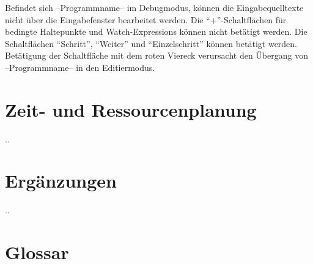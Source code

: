 \documentclass[parskip=full]{scrartcl}
\begin{document}
        Befindet sich --Programmname-- im Debugmodus, können die Eingabequelltexte nicht
        über die Eingabefenster bearbeitet werden. Die \enquote{+}-Schaltflächen für bedingte Haltepunkte
        und Watch-Expressions können nicht betätigt werden.
        Die Schaltflächen \enquote{Schritt}, \enquote{Weiter} und \enquote{Einzelschritt} können betätigt werden.
        Betätigung der Schaltfläche mit dem roten Viereck verursacht den Übergang von --Programmname-- in den Editiermodus.
        
        
\section{Zeit- und Ressourcenplanung}
..

\section{Ergänzungen}
..

\section{Glossar}
\end{document}
